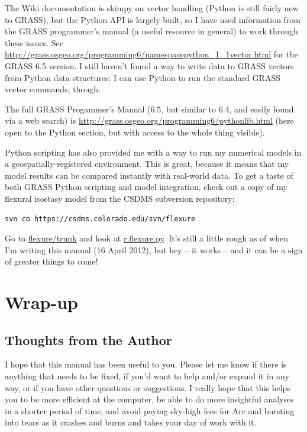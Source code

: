 \documentclass{book}
\begin{document}
The Wiki documentation is skimpy on vector handling (Python is still fairly new to GRASS), but the Python API is largely built, so I have used information from the GRASS programmer's manual (a useful resource in general) to work through these issues. See \url{http://grass.osgeo.org/programming6/namespacepython_1_1vector.html} for the GRASS 6.5 version. I still haven't found a way to write data to GRASS vectors from Python data structures: I can use Python to run the standard GRASS vector commands, though.

The full GRASS Progammer's Manual (6.5, but similar to 6.4, and easily found via a web search) is \url{http://grass.osgeo.org/programming6/pythonlib.html} (here open to the Python section, but with access to the whole thing visible).

Python scripting has also provided me with a way to run my numerical models in a geospatially-registered environment. This is great, because it means that my model results can be compared instantly with real-world data. To get a taste of both GRASS Python scripting and model integration, check out a copy of my flexural isostasy model from the CSDMS subversion repository:

\begin{lstlisting}
svn co https://csdms.colorado.edu/svn/flexure
\end{lstlisting}
 
Go to \url{flexure/trunk} and look at \url{r.flexure.py}. It's still a little rough as of when I'm writing this manual (16 April 2012), but hey -- it works -- and it can be a sign of greater things to come!

\chapter{Wrap-up}

\section{Thoughts from the Author}

I hope that this manual has been useful to you. Please let me know if there is anything that needs to be fixed, if you'd want to help and/or expand it in any way, or if you have other questions or suggestions. I really hope that this helps you to be more efficient at the computer, be able to do more insightful analyses in a shorter period of time, and avoid paying sky-high fees for Arc and bursting into tears as it crashes and burns and takes your day of work with it.
\end{document}
